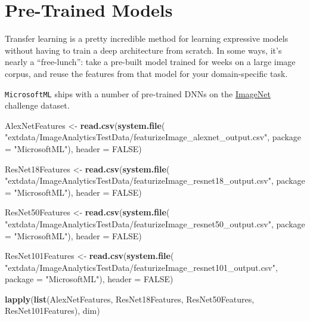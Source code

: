 \documentclass[]{book}
\newenvironment{Shaded}{\begin{snugshade}}{\end{snugshade}}
\newcommand{\KeywordTok}[1]{\textcolor[rgb]{0.13,0.29,0.53}{\textbf{#1}}}
\newcommand{\DataTypeTok}[1]{\textcolor[rgb]{0.13,0.29,0.53}{#1}}
\newcommand{\StringTok}[1]{\textcolor[rgb]{0.31,0.60,0.02}{#1}}
\newcommand{\OtherTok}[1]{\textcolor[rgb]{0.56,0.35,0.01}{#1}}
\newcommand{\NormalTok}[1]{#1}
\theoremstyle{definition}
\theoremstyle{definition}
\theoremstyle{definition}
\theoremstyle{remark}
\begin{document}
\section{Pre-Trained Models}\label{pre-trained-models}

Transfer learning is a pretty incredible method for learning expressive
models without having to train a deep architecture from scratch. In some
ways, it's nearly a ``free-lunch'': take a pre-built model trained for
weeks on a large image corpus, and reuse the features from that model
for your domain-specific task.

\texttt{MicrosoftML} ships with a number of pre-trained DNNs on the
\href{http://www.image-net.org/}{ImageNet} challenge dataset.

\begin{Shaded}
\begin{Highlighting}[]
\NormalTok{AlexNetFeatures <-}\StringTok{ }\KeywordTok{read.csv}\NormalTok{(}\KeywordTok{system.file}\NormalTok{(}
  \StringTok{"extdata/ImageAnalyticsTestData/featurizeImage_alexnet_output.csv"}\NormalTok{,}
  \DataTypeTok{package =} \StringTok{"MicrosoftML"}\NormalTok{), }
  \DataTypeTok{header =} \OtherTok{FALSE}\NormalTok{)}

\NormalTok{ResNet18Features <-}\StringTok{ }\KeywordTok{read.csv}\NormalTok{(}\KeywordTok{system.file}\NormalTok{(}
  \StringTok{"extdata/ImageAnalyticsTestData/featurizeImage_resnet18_output.csv"}\NormalTok{,}
  \DataTypeTok{package =} \StringTok{"MicrosoftML"}\NormalTok{),}
  \DataTypeTok{header =} \OtherTok{FALSE}\NormalTok{)}

\NormalTok{ResNet50Features <-}\StringTok{ }\KeywordTok{read.csv}\NormalTok{(}\KeywordTok{system.file}\NormalTok{(}
  \StringTok{"extdata/ImageAnalyticsTestData/featurizeImage_resnet50_output.csv"}\NormalTok{,}
  \DataTypeTok{package =} \StringTok{"MicrosoftML"}\NormalTok{), }
  \DataTypeTok{header =} \OtherTok{FALSE}\NormalTok{)}

\NormalTok{ResNet101Features <-}\StringTok{ }\KeywordTok{read.csv}\NormalTok{(}\KeywordTok{system.file}\NormalTok{(}
  \StringTok{"extdata/ImageAnalyticsTestData/featurizeImage_resnet101_output.csv"}\NormalTok{,}
  \DataTypeTok{package =} \StringTok{"MicrosoftML"}\NormalTok{), }
  \DataTypeTok{header =} \OtherTok{FALSE}\NormalTok{)}

\KeywordTok{lapply}\NormalTok{(}\KeywordTok{list}\NormalTok{(AlexNetFeatures, ResNet18Features, ResNet50Features, ResNet101Features),}
\NormalTok{       dim)}
\end{Highlighting}
\end{Shaded}
\end{document}
